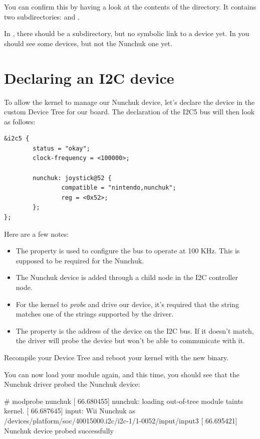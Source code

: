 You can confirm this by having a look at the contents of the
 directory.  It contains two subdirectories:
 and .

In , there should be a  subdirectory,
but no symbolic link to a device yet. In  you should
see some devices, but not the Nunchuk one yet.

\section{Declaring an I2C device}

To allow the kernel to manage our Nunchuk device, let's declare the
device in the custom Device Tree for our board. The declaration of the I2C5
bus will then look as follows:

\begin{verbatim}
&i2c5 {
        status = "okay";
        clock-frequency = <100000>;

        nunchuk: joystick@52 {
                compatible = "nintendo,nunchuk";
                reg = <0x52>;
        };
};
\end{verbatim}

Here are a few notes:
\begin{itemize}
\item The  property is used to configure the bus
      to operate at 100 KHz. This is supposed to be required for the
      Nunchuk.
\item The Nunchuk device is added through a child node in the I2C
      controller node.
\item For the kernel to {\em probe} and drive our device, it's required
      that the  string matches one of the
       strings supported by the driver.
\item The  property is the address of the device on the
      I2C bus. If it doesn't match, the driver will probe the device
      but won't be able to communicate with it.
\end{itemize}

Recompile your Device Tree and reboot your kernel with the new binary.

You can now load your module again, and this time, you should see that
the Nunchuk driver probed the Nunchuk device:

\begin{bashinput}
# modprobe nunchuk
[   66.680455] nunchuk: loading out-of-tree module taints kernel.
[   66.687645] input: Wii Nunchuk as /devices/platform/soc/40015000.i2c/i2c-1/1-0052/input/input3
[   66.695421] Nunchuk device probed successfully
\end{bashinput}

